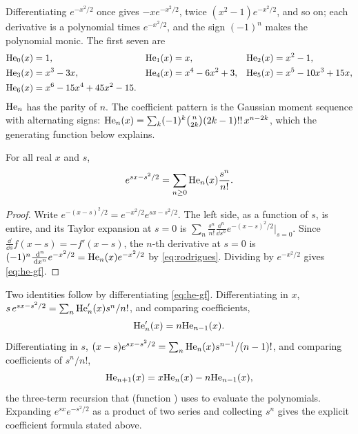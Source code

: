 Differentiating $e^{-x^2/2}$ once gives $-xe^{-x^2/2}$, twice $(x^2-1)e^{-x^2/2}$, and
so on; each derivative is a polynomial times $e^{-x^2/2}$, and the sign $(-1)^n$ makes
the polynomial monic. The first seven are
\begin{equation}
\begin{aligned}
  \mathrm{He}_{0}(x)&=1, & \mathrm{He}_{1}(x)&=x, & \mathrm{He}_{2}(x)&=x^2-1,\\
  \mathrm{He}_{3}(x)&=x^3-3x, & \mathrm{He}_{4}(x)&=x^4-6x^2+3, & \mathrm{He}_{5}(x)&=x^5-10x^3+15x,\\
  \mathrm{He}_{6}(x)&=x^6-15x^4+45x^2-15.
\end{aligned}
\label{eq:he-list}
\end{equation}
$\mathrm{He}_{n}$ has the parity of $n$. The coefficient pattern is the Gaussian moment
sequence with alternating signs: $\mathrm{He}_{n}(x)=\sum_k(-1)^k\binom{n}{2k}(2k-1)!!\,x^{n-2k}$,
which the generating function below explains.

\begin{proposition}
\label{prop:he-gf}
For all real $x$ and $s$,
\begin{equation}
  e^{sx-s^2/2}=\sum_{n\ge0}\mathrm{He}_{n}(x)\frac{s^n}{n!}.
  \label{eq:he-gf}
\end{equation}
\end{proposition}
\begin{proof}
Write $e^{-(x-s)^2/2}=e^{-x^2/2}e^{sx-s^2/2}$. The left side, as a function of $s$,
is entire, and its Taylor expansion at $s=0$ is
$\sum_n\frac{s^n}{n!}\frac{\dd^n}{\dd s^n}e^{-(x-s)^2/2}\big|_{s=0}$. Since
$\frac{\dd}{\dd s}f(x-s)=-f'(x-s)$, the $n$-th derivative at $s=0$ is
$(-1)^n\frac{\,\mathrm{d}^n}{\,\mathrm{d} x^n}e^{-x^2/2}=\mathrm{He}_{n}(x)e^{-x^2/2}$ by \cref{eq:rodrigues}.
Dividing by $e^{-x^2/2}$ gives \cref{eq:he-gf}.
\end{proof}

Two identities follow by differentiating \cref{eq:he-gf}. Differentiating in $x$,
$s\,e^{sx-s^2/2}=\sum_n\mathrm{He}_{n}'(x)s^n/n!$, and comparing coefficients,
\begin{equation}
  \mathrm{He}_{n}'(x)=n\mathrm{He}_{n-1}(x).
  \label{eq:he-derivative}
\end{equation}
Differentiating in $s$, $(x-s)e^{sx-s^2/2}=\sum_n\mathrm{He}_{n}(x)s^{n-1}/(n-1)!$, and
comparing coefficients of $s^n/n!$,
\begin{equation}
  \mathrm{He}_{n+1}(x)=x\mathrm{He}_{n}(x)-n\mathrm{He}_{n-1}(x),
  \label{eq:he-recursion}
\end{equation}
the three-term recursion that  (function )
uses to evaluate the polynomials. Expanding $e^{sx}e^{-s^2/2}$ as a product of two
series and collecting $s^n$ gives the explicit coefficient formula stated above.

